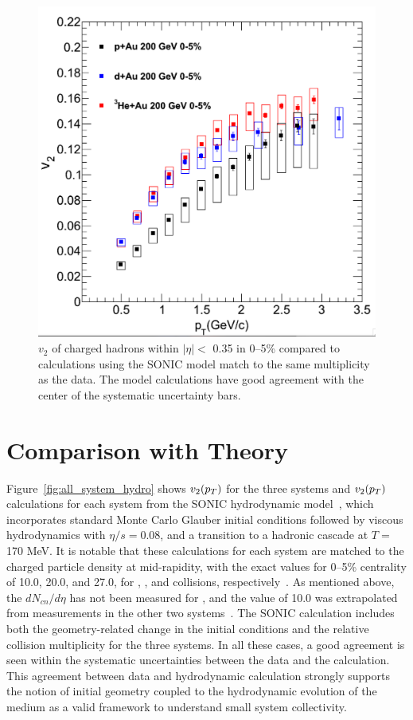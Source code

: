 \begin{figure}[!ht]
\begin{center}
\includegraphics[width=0.65\linewidth]{figs/v2_3_sys_compare_nohydro.png}
\caption{$v_2$ of charged hadrons within $|\eta| <$ 0.35 in 0--5\% \pau compared to calculations using the SONIC model match to the same multiplicity as the data. The model calculations have good agreement with the center of the systematic uncertainty bars.}
\label{fig:v2_3_sys_compare_nohydro}
\end{center}
\end{figure}

\section{Comparison with Theory}
Figure~\ref{fig:all_system_hydro} shows $v_2(\mbox{$p_T$})$ for the three systems and $v_2(\mbox{$p_T$})$ calculations for each system from the SONIC hydrodynamic model~\cite{Habich:2014jna}, which incorporates standard Monte Carlo Glauber initial conditions followed by viscous hydrodynamics with $\eta/s=0.08$, and a transition to a hadronic cascade at $T=$ 170 MeV. It is notable that these calculations for each system are matched to the charged particle density at mid-rapidity, with the exact values for 0--5\% centrality of 10.0, 20.0, and 27.0, for \pau, \dau, and \hau collisions, respectively~\cite{Habich:2014jna}. As mentioned above, the $dN_{cn}/d\eta$ has not been measured for \pau, and the value of 10.0 was extrapolated from measurements in the other two systems~\cite{Habich:2014jna}. The SONIC calculation includes both the geometry-related change in the initial conditions and the relative collision multiplicity for the three systems. In all these cases, a good agreement is seen within the systematic uncertainties between the data and the calculation. This agreement between data and hydrodynamic calculation strongly supports the notion of initial geometry coupled to the hydrodynamic evolution of the medium as a valid framework to understand small system collectivity.

